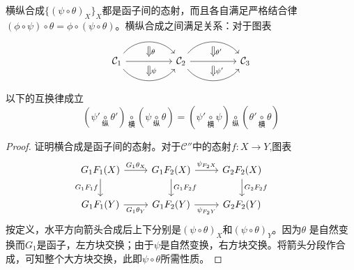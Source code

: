 \begin{Lem}横纵合成$\{(\psi \circ \theta)_X\}_X$都是函子间的态射，而且各自满足严格结合律$(\phi \circ \psi) \circ \theta = \phi \circ (\psi \circ \theta)$。横纵合成之间满足关系：对于图表
    \[\begin{tikzcd}
        \mathcal{C}_1
            \arrow[bend left = 50, rr, ""' name = U1]
            \arrow[rr, "" name = UM1, ""' name = DM1]
            \arrow[bend right = 50, rr, "" name = D1]   & &
        \mathcal{C}_2
            \arrow[bend left = 50, rr, ""' name = U2]
            \arrow[rr, "" name = UM2, ""' name = DM2]
            \arrow[bend right = 50, rr, "" name = D2]  & &
        \mathcal{C}_3
        \arrow[Rightarrow, to path = (U1)--(UM1) \tikztonodes, "\theta"]
        \arrow[Rightarrow, to path = (DM1)--(D1) \tikztonodes, "\psi"]
        \arrow[Rightarrow, to path = (U2)--(UM2) \tikztonodes, "{\theta '}"]
        \arrow[Rightarrow, to path = (DM2)--(D2) \tikztonodes, "{\psi '}"]
    \end{tikzcd}\]
    以下的互换律成立
    \[
        \left( \psi' \underset{\text{纵}}{\circ} \theta ' \right)
        \underset{\text{横}}{\circ}
        \left( \psi  \underset{\text{纵}}{\circ} \theta   \right)
        =
        \left( \psi' \underset{\text{横}}{\circ} \psi \right)
        \underset{\text{纵}}{\circ}
        \left( \theta ' \underset{\text{横}}{\circ} \theta \right)
    \]
    \begin{proof} 证明横合成是函子间的态射。对于$\mathcal{C}''$中的态射$f:X\to Y$,图表
        \[\begin{tikzcd}
            G_1 F_1(X)
                \arrow[r, "G_1 \theta_X"]
                \arrow[d, "G_1 F_1 f"'] &
            G_1 F_2(X)
                \arrow[r, "\psi_{F_2 X}"]
                \arrow[d, "G_1 F_2 f"]  &
            G_2 F_2(X)
                \arrow[d, "G_2 F_2 f"] &    \\
            G_1 F_1(Y)
                \arrow[r, "G_1 \theta_Y"'] &
            G_1 F_2(Y)
                \arrow[r, "\psi_{F_2 Y}"'] &
            G_2 F_2(Y)
        \end{tikzcd}\]
        按定义，水平方向箭头合成后上下分别是$(\psi \circ \theta)_X$和$(\psi \circ \theta)_Y$。因为$\theta$ 是自然变换而$G_1$是函子，左方块交换；由于$\psi$是自然变换，右方块交换。将箭头分段作合成，可知整个大方块交换，此即$\psi\circ \theta$所需性质。


\end{proof}
\end{Lem}
